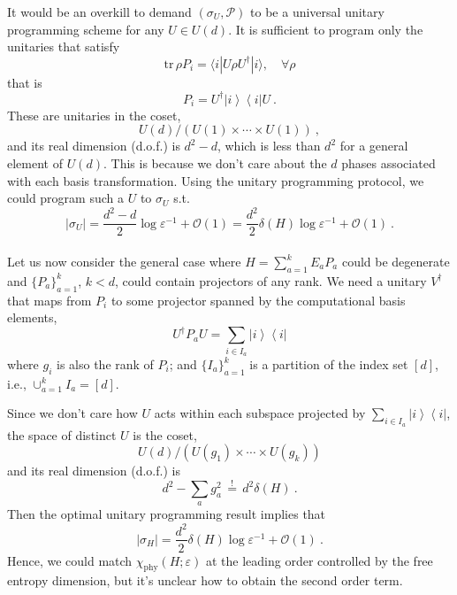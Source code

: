 \documentclass[11pt,letterpaper]{article}
\newcommand{\ket}[1]{| #1 \rangle}
\newcommand{\bra}[1]{\langle #1 |}
\newcommand{\ketbra}[2]{\left|#1\right\rangle\!\!\left\langle #2\right|}
\def\eps{\varepsilon}
\def\O{\mathcal{O}}
\def\tr{\mathrm{tr}}
\begin{document}
It would be an overkill to demand $(\sigma_U,\mathcal{P})$ to be a universal unitary programming scheme for any $U\in U(d)$. It is sufficient to program only the unitaries that satisfy
\begin{equation}
     \tr\,\rho P_i=\bra{i}U\rho U^\dagger\ket{i},\quad\forall \rho
\end{equation}
that is
\begin{equation}
    P_i=U^\dagger\ketbra{i}{i}U\ .
\end{equation}
These are unitaries in the coset,
\begin{equation}
    U(d)\Big/(U(1)\times\cdots\times U(1))\ ,
\end{equation}
and its real dimension (d.o.f.) is $d^2-d$, which is less than $d^2$ for a general element of $U(d)$. This is because we don't care about the $d$ phases associated with each basis transformation. Using the unitary programming protocol, we could program such a $U$ to $\sigma_U$ s.t.
\begin{equation}
    |\sigma_U| = \frac{d^2-d}{2}\log\eps^{-1} + \O(1) = \frac{d^2}{2}\delta(H)\log\eps^{-1} + \O(1)\ . 
\end{equation}\\

Let us now consider the general case where $H=\sum_{a=1}^k E_a P_a$ could be degenerate and $\{P_a\}_{a=1}^k$, $k<d$, could contain projectors of any rank. We need a unitary $V^\dagger$ that maps from $P_i$ to some projector spanned by the computational basis elements,
\begin{equation}
     U^\dagger P_a U=\sum_{i\in I_a}\ketbra{i}{i}
\end{equation}
where $g_i$ is also the rank of $P_i$; and $\{I_a\}_{a=1}^k$ is a partition of the index set $[d]$, i.e., $\cup_{a=1}^k I_a=[d]$.

Since we don't care how $U$ acts within each subspace projected by $\sum_{i\in I_a}\ketbra{i}{i}$, the space of distinct $U$ is the coset,
\begin{equation}\label{eq:flag_manifold}
    U(d)\Big/(U(g_1)\times\cdots\times U(g_k))
\end{equation}
and its real dimension (d.o.f.) is 
\begin{equation}
    d^2-\sum_a g_a^2\, \stackrel{!}{=}\, d^2\delta(H)\ .
\end{equation}
Then the optimal unitary programming result implies that 
\begin{equation}
    |\sigma_H| = \frac{d^2}2\delta(H)\log\eps^{-1}+\O(1)\ .
\end{equation}
Hence, we could match $\chi_\mathrm{phy}(H;\eps)$ at the leading order controlled by the free entropy dimension, but it's unclear how to obtain the second order term.
\end{document}
